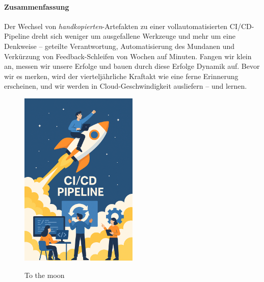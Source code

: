 \paragraph{Zusammenfassung}
Der Wechsel von \textit{handkopierten}-Artefakten zu einer vollautomatisierten CI/CD-Pipeline dreht sich weniger um ausgefallene Werkzeuge und mehr um eine Denkweise – geteilte Verantwortung, Automatisierung des Mundanen und Verkürzung von Feedback-Schleifen von Wochen auf Minuten. Fangen wir klein an, messen wir unsere Erfolge und bauen durch diese Erfolge Dynamik auf. Bevor wir es merken, wird der vierteljährliche Kraftakt wie eine ferne Erinnerung erscheinen, und wir werden in Cloud-Geschwindigkeit ausliefern – und lernen.
\begin{figure}[h!]
    \centering
    \caption{To the moon}
        \includegraphics[width=0.5\textwidth]{fig/tothemoon.png}
        \label{fig:ASD-diagram}
    \end{figure}

